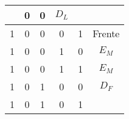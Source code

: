 \begin{table}[!htb]
\begin{tabular}{|ccccc|c|}
                                  & {\color[HTML]{00009B} 0}                                    & {\color[HTML]{00009B} 0}                            
 
       & {\color[HTML]{FE0000} $D_L$}                                     \\ \hline
{\color[HTML]{00009B} 1}                                     & {\color[HTML]{00009B} 0}                                    & {\color[HTML]{00009B} 0} 
 
                                  & {\color[HTML]{00009B} 0}                                    & {\color[HTML]{00009B} 1}                            
 
       & {\color[HTML]{FE0000} Frente}                                     \\ \hline
{\color[HTML]{00009B} 1}                                     & {\color[HTML]{00009B} 0}                                    & {\color[HTML]{00009B} 0} 
 
                                  & {\color[HTML]{00009B} 1}                                    & {\color[HTML]{00009B} 0}                            
 
       & {\color[HTML]{FE0000} $E_M$}                                     \\ \hline
{\color[HTML]{00009B} 1}                                     & {\color[HTML]{00009B} 0}                                    & {\color[HTML]{00009B} 0} 
 
                                  & {\color[HTML]{00009B} 1}                                    & {\color[HTML]{00009B} 1}                            
 
       & {\color[HTML]{FE0000} $E_M$}                                     \\ \hline
{\color[HTML]{00009B} 1}                                     & {\color[HTML]{00009B} 0}                                    & {\color[HTML]{00009B} 1} 
 
                                  & {\color[HTML]{00009B} 0}                                    & {\color[HTML]{00009B} 0}                            
 
       & {\color[HTML]{FE0000} $D_F$}                                     \\ \hline
{\color[HTML]{00009B} 1}                                     & {\color[HTML]{00009B} 0}                                    & {\color[HTML]{00009B} 1} 
 
                                  & {\color[HTML]{00009B} 0}                                    & {\color[HTML]{00009B} 1}                            
 

\end{tabular}
\end{table}
